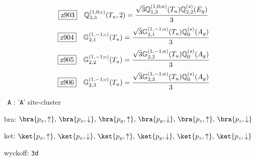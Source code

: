 \documentclass[fleqn,10pt,landscape]{jsarticle}
\begin{document}
\begin{dmath*}
\hspace*{3mm}\fbox{z903}\quad \mathbb{Q}_{3,3}^{(1,0;c)}(T_{u},2)=\frac{\sqrt{3} \mathbb{Q}_{1,3}^{(1,0;a)}(T_{u}) \mathbb{Q}_{2,2}^{(s)}(E_{g})}{3}
\end{dmath*}
\begin{dmath*}
\hspace*{3mm}\fbox{z904}\quad \mathbb{G}_{2,1}^{(1,-1;c)}(T_{u})=\frac{\sqrt{3} \mathbb{G}_{2,1}^{(1,-1;a)}(T_{u}) \mathbb{Q}_{0}^{(s)}(A_{g})}{3}
\end{dmath*}
\begin{dmath*}
\hspace*{3mm}\fbox{z905}\quad \mathbb{G}_{2,2}^{(1,-1;c)}(T_{u})=\frac{\sqrt{3} \mathbb{G}_{2,2}^{(1,-1;a)}(T_{u}) \mathbb{Q}_{0}^{(s)}(A_{g})}{3}
\end{dmath*}
\begin{dmath*}
\hspace*{3mm}\fbox{z906}\quad \mathbb{G}_{2,3}^{(1,-1;c)}(T_{u})=\frac{\sqrt{3} \mathbb{G}_{2,3}^{(1,-1;a)}(T_{u}) \mathbb{Q}_{0}^{(s)}(A_{g})}{3}
\end{dmath*}
\vspace{5mm}

\noindent\textbullet\, \texttt{A} : '\texttt{A}' site-cluster

\noindent\quad * bra: $\bra{p_{x},\uparrow},\, \bra{p_{x},\downarrow},\, \bra{p_{y},\uparrow},\, \bra{p_{y},\downarrow},\, \bra{p_{z},\uparrow},\, \bra{p_{z},\downarrow}$

\noindent\quad * ket: $\ket{p_{x},\uparrow},\, \ket{p_{x},\downarrow},\, \ket{p_{y},\uparrow},\, \ket{p_{y},\downarrow},\, \ket{p_{z},\uparrow},\, \ket{p_{z},\downarrow}$

\noindent\quad * wyckoff: \texttt{3d}
\end{document}
